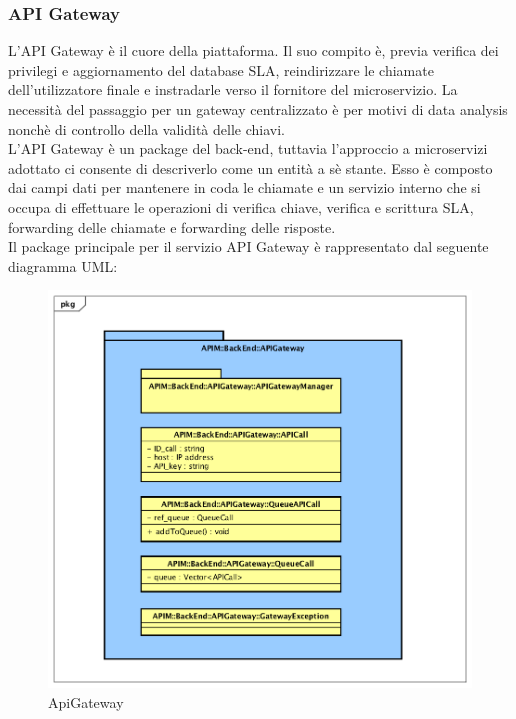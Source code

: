 \subsubsection{API Gateway}

L'API Gateway è il cuore della piattaforma. Il suo compito è, previa verifica dei privilegi e aggiornamento del database SLA, reindirizzare le chiamate dell'utilizzatore finale e instradarle verso il fornitore del microservizio.  La necessità del passaggio per un gateway centralizzato è per motivi di data analysis nonchè di controllo della validità delle chiavi. \\

L'API Gateway è un package del back-end, tuttavia l'approccio a microservizi adottato ci consente di descriverlo come un entità a sè stante. Esso è composto dai campi dati per mantenere in coda le chiamate e un servizio interno che si occupa di effettuare le operazioni di verifica chiave, verifica e scrittura SLA, forwarding delle chiamate e forwarding delle risposte.  \\

Il package principale per il servizio API Gateway è rappresentato dal seguente diagramma UML:


\begin{figure}[!htbp]
	\centering
	\includegraphics[scale=0.45]{UML/DiagrammiPackage/ApiGateway.png}
	\caption{ApiGateway}
\end{figure}


